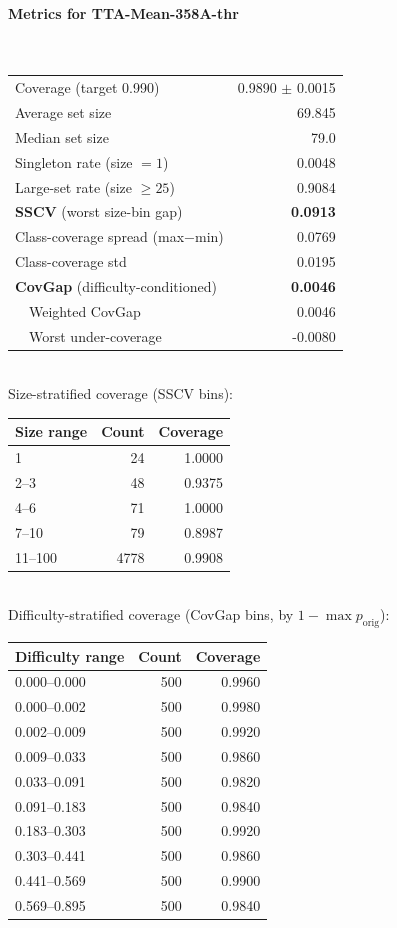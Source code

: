 \documentclass[parskip=half]{scrartcl}
\begin{document}
\paragraph{Metrics for TTA-Mean-358A-thr}~\\
\begin{tabular}{l r}
\hline
Coverage (target 0.990) & 0.9890 $\pm$ 0.0015 \\
Average set size & 69.845 \\
Median set size & 79.0 \\
Singleton rate (size $=1$) & 0.0048 \\
Large-set rate (size $\geq 25$) & 0.9084 \\
\textbf{SSCV} (worst size-bin gap) & \textbf{0.0913} \\
Class-coverage spread (max$-$min) & 0.0769 \\
Class-coverage std & 0.0195 \\
\textbf{CovGap} (difficulty-conditioned) & \textbf{0.0046} \\
~~Weighted CovGap & 0.0046 \\
~~Worst under-coverage & -0.0080 \\
\hline
\end{tabular}\\[0.5em]
\textsf{\scriptsize Size-stratified coverage (SSCV bins):}\\
\begin{tabular}{l r r}
\hline
Size range & Count & Coverage \\
\hline
1 & 24 & 1.0000 \\
2--3 & 48 & 0.9375 \\
4--6 & 71 & 1.0000 \\
7--10 & 79 & 0.8987 \\
11--100 & 4778 & 0.9908 \\
\hline
\end{tabular}\\[0.5em]
\textsf{\scriptsize Difficulty-stratified coverage (CovGap bins, by $1-\max p_{\mathrm{orig}}$):}\\
\begin{tabular}{l r r}
\hline
Difficulty range & Count & Coverage \\
\hline
0.000--0.000 & 500 & 0.9960 \\
0.000--0.002 & 500 & 0.9980 \\
0.002--0.009 & 500 & 0.9920 \\
0.009--0.033 & 500 & 0.9860 \\
0.033--0.091 & 500 & 0.9820 \\
0.091--0.183 & 500 & 0.9840 \\
0.183--0.303 & 500 & 0.9920 \\
0.303--0.441 & 500 & 0.9860 \\
0.441--0.569 & 500 & 0.9900 \\
0.569--0.895 & 500 & 0.9840 \\
\hline
\end{tabular}\\[0.5em]
\end{document}

